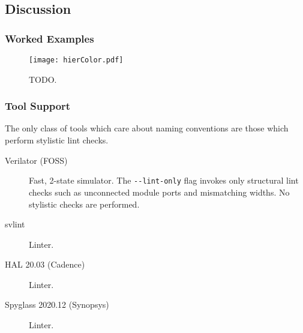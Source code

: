 \documentclass[a4paper]{article}
\begin{document}

\subsection{Discussion} %
\label{sec:HungarianNotation_discussion}

\subsubsection{Worked Examples} %
\label{sec:HungarianNotation_workedExamples}

\begin{figure}[t] %
\centering
\texttt{[image: hierColor.pdf]}
\caption{TODO.
\label{fig:hierColor}}
\end{figure} %


\subsubsection{Tool Support} %
\label{sec:HungarianNotation_toolSupport}
The only class of tools which care about naming conventions are those which
perform stylistic lint checks.

\begin{description}
\item[Verilator (\gls{FOSS})]
  Fast, 2-state simulator.
  The \texttt{{-}{-}lint-only} flag invokes only structural lint checks such as
  unconnected module ports and mismatching widths.
  No stylistic checks are performed.
\item[svlint]
  Linter.
\item[HAL 20.03 (Cadence)]
  Linter.
\item[Spyglass 2020.12 (Synopsys)]
  Linter.
\end{description}
\end{document}
